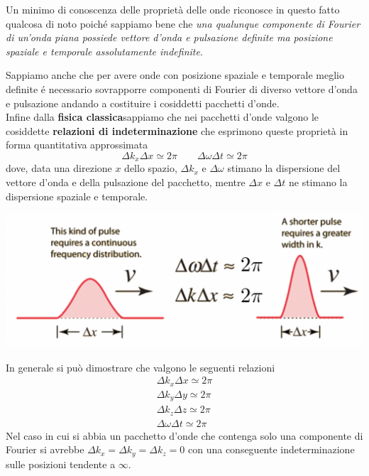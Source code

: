 Un minimo di conoscenza delle proprietà delle onde riconosce in questo
fatto qualcosa di noto poiché sappiamo bene che \emph{una qualunque
componente di Fourier di un'onda piana possiede vettore d'onda e
pulsazione definite ma posizione spaziale e temporale assolutamente
indefinite}.

Sappiamo anche che per avere onde con posizione spaziale e temporale
meglio definite é necessario sovrapporre componenti di Fourier di
diverso vettore d'onda e pulsazione andando a costituire i cosiddetti
pacchetti d'onde.\\
Infine dalla \textbf{fisica classica}sappiamo che nei pacchetti d'onde valgono
le cosiddette \textbf{relazioni di indeterminazione} che esprimono
queste proprietà in forma quantitativa approssimata
\[
    \Delta k_{x} \Delta x \simeq2 \pi \qquad \Delta \omega \Delta t \simeq2 \pi
\] dove, data una direzione $x$ dello spazio, \(\Delta k_{x}\) e
\(\Delta \omega\) stimano la dispersione del vettore d'onda e della
pulsazione del pacchetto, mentre \(\Delta x\) e \(\Delta t\) ne stimano
la dispersione spaziale e temporale.
\begin{marginfigure}
    \includegraphics{figs/rel-indet}
    \label{fig:rel-indet}
\end{marginfigure}

In generale si può dimostrare che valgono le seguenti relazioni
\begin{gather*}
    \Delta k_{x} \Delta x \simeq2 \pi\\
    \Delta k_{y} \Delta y \simeq2 \pi\\
    \Delta k_{z} \Delta z \simeq2 \pi\\
    \Delta \omega \Delta t \simeq2 \pi
\end{gather*} Nel caso in cui si abbia un pacchetto d'onde che contenga solo una
componente di Fourier si avrebbe
\(\Delta k_{x} = \Delta k_{y} = \Delta k_{z} = 0\) con una conseguente
indeterminazione sulle posizioni tendente a \(\infty\).

